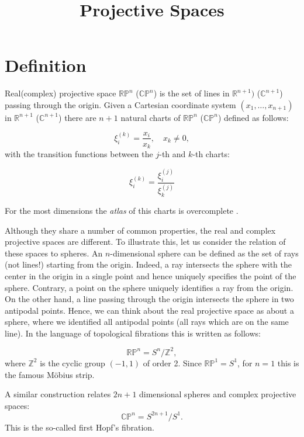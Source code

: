 \documentclass[a4paper,10pt]{article}
\title{Projective Spaces}
\author{}
\date{}
\begin{document}
\maketitle
\section{Definition}

Real(complex) projective space $\mathbb{RP}^n$ ($\mathbb{CP}^n$) is the set of lines in $\mathbb{R}^{n+1})$ ($\mathbb{C}^{n+1}$) passing through the origin. Given a Cartesian coordinate system $(x_1,\ldots, x_{n+1})$ in $\mathbb{R}^{n+1}$ ($\mathbb{C}^{n+1}$) there are $n+1$ natural charts of $\mathbb{RP}^n$ ($\mathbb{CP}^n$) defined as follows:

\begin{equation}
 \xi_i^{(k)} = \frac{x_i}{x_k}, \quad x_k\neq 0 \label{chartk},
\end{equation}
with the transition functions between the $j$-th and $k$-th charts:

\begin{equation}
 \xi^{(k)}_i = \frac{\xi^{(j)}_i }{\xi^{(j)}_k }
\end{equation}

For the most dimensions the {\it atlas } of this charts is overcomplete \cite{mhopkins}.

Although they share a number of common properties, the real and complex projective spaces are different. To illustrate this, let us consider the relation of these spaces to spheres. An $n$-dimensional sphere can be defined as the set of rays (not lines!) starting from the origin. Indeed, a ray intersects the sphere with the center in the origin in a single point and hence uniquely specifies the point of the sphere. Contrary, a point on the sphere uniquely identifies a ray from the origin. On the other hand, a line passing through the origin intersects the sphere in two antipodal points. Hence, we can think about the real projective space as about a sphere, where we identified all antipodal points (all rays which are on the same line). In the language of topological fibrations this is written as follows:

\begin{equation}
\mathbb{RP}^n = S^{n}/\mathbb{Z}^2,
\end{equation} 
where $\mathbb{Z}^2$ is the cyclic group $(-1,1)$ of order 2. Since $\mathbb{RP}^1 = S^1$, for $n=1$ this is the famous M\"obius strip.

A similar construction relates $2n+1$ dimensional spheres and complex projective spaces:
\begin{equation}
\mathbb{CP}^n = S^{2n+1}/S^1.
\end{equation}
This is the so-called first Hopf's fibration.
\end{document}

